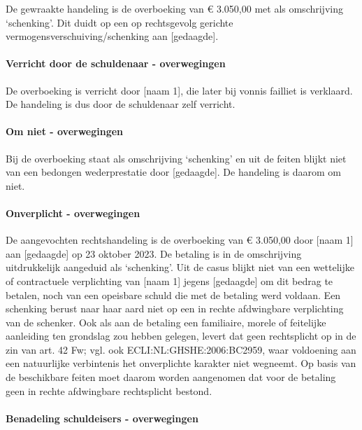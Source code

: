 \documentclass[
  dutch,
  a4paper,
]{article}
\begin{document}
De gewraakte handeling is de overboeking van € 3.050,00 met als omschrijving `schenking'. Dit duidt op een op rechtsgevolg gerichte vermogensverschuiving/schenking aan {[}gedaagde{]}.

\paragraph{Verricht door de schuldenaar - overwegingen}\label{verricht-door-de-schuldenaar---overwegingen-31}

De overboeking is verricht door {[}naam 1{]}, die later bij vonnis failliet is verklaard. De handeling is dus door de schuldenaar zelf verricht.

\paragraph{Om niet - overwegingen}\label{om-niet---overwegingen-31}

Bij de overboeking staat als omschrijving `schenking' en uit de feiten blijkt niet van een bedongen wederprestatie door {[}gedaagde{]}. De handeling is daarom om niet.

\paragraph{Onverplicht - overwegingen}\label{onverplicht---overwegingen-31}

De aangevochten rechtshandeling is de overboeking van € 3.050,00 door {[}naam 1{]} aan {[}gedaagde{]} op 23 oktober 2023. De betaling is in de omschrijving uitdrukkelijk aangeduid als `schenking'. Uit de casus blijkt niet van een wettelijke of contractuele verplichting van {[}naam 1{]} jegens {[}gedaagde{]} om dit bedrag te betalen, noch van een opeisbare schuld die met de betaling werd voldaan. Een schenking berust naar haar aard niet op een in rechte afdwingbare verplichting van de schenker. Ook als aan de betaling een familiaire, morele of feitelijke aanleiding ten grondslag zou hebben gelegen, levert dat geen rechtsplicht op in de zin van art. 42 Fw; vgl. ook ECLI:NL:GHSHE:2006:BC2959, waar voldoening aan een natuurlijke verbintenis het onverplichte karakter niet wegneemt. Op basis van de beschikbare feiten moet daarom worden aangenomen dat voor de betaling geen in rechte afdwingbare rechtsplicht bestond.

\paragraph{Benadeling schuldeisers - overwegingen}\label{benadeling-schuldeisers---overwegingen-31}
\end{document}
